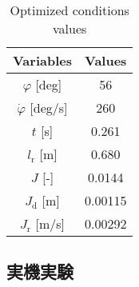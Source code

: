         \begin{table}[tb]
          \begin{center}
            \caption{Optimized conditions values}
            \vspace{2mm}
            \begin{tabular}{c|c}
              \hline
              \hline
              Variables & Values \\
              \hline
              \hline
              $\varphi$ [deg] & 56 \\
              $\dot{\varphi}$ [deg/s] & 260 \\
              $t$ [s] & 0.261 \\
              $l_{\mathrm{r}}$ [m] & 0.680 \\
              \hline
              $J$ [-] & 0.0144 \\
              $J_{\mathrm{d}}$ [m] & 0.00115 \\
              $J_{\mathrm{r}}$ [m/s] & 0.00292 \\
              \hline
            \end{tabular}
          \end{center}
        \end{table}
        
        \subsection{実機実験}
        

